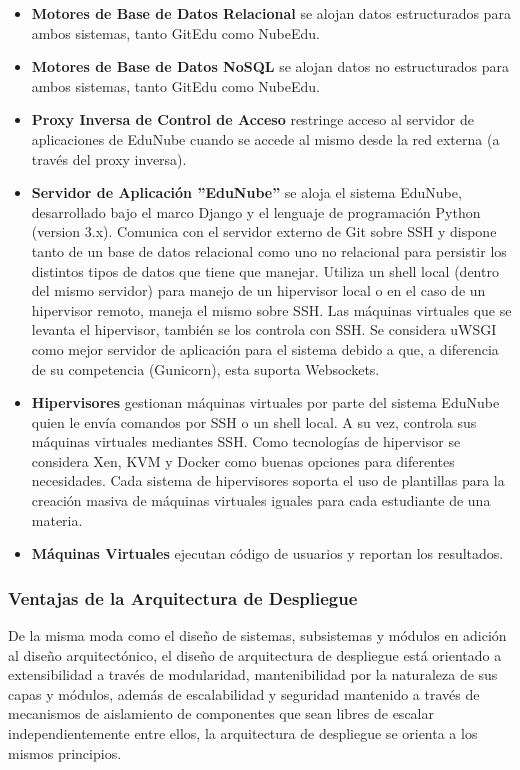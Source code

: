 \begin{itemize}
    \item \textbf{Motores de Base de Datos Relacional} se alojan datos estructurados para ambos sistemas, tanto GitEdu como NubeEdu.
    \item \textbf{Motores de Base de Datos NoSQL} se alojan datos no estructurados para ambos sistemas, tanto GitEdu como NubeEdu.
    \item \textbf{Proxy Inversa de Control de Acceso} restringe acceso al servidor de aplicaciones de EduNube cuando se accede al mismo desde la red externa (a través del proxy inversa).
    \item \textbf{Servidor de Aplicación ''EduNube''} se aloja el sistema EduNube, desarrollado bajo el marco Django y el lenguaje de programación Python (version 3.x). Comunica con el servidor externo de Git sobre SSH y dispone tanto de un base de datos relacional como uno no relacional para persistir los distintos tipos de datos que tiene que manejar. Utiliza un shell local (dentro del mismo servidor) para manejo de un hipervisor local o en el caso de un hipervisor remoto, maneja el mismo sobre SSH. Las máquinas virtuales que se levanta el hipervisor, también se los controla con SSH. Se considera uWSGI como mejor servidor de aplicación para el sistema debido a que, a diferencia de su competencia (Gunicorn), esta suporta Websockets.
    \item \textbf{Hipervisores} gestionan máquinas virtuales por parte del sistema EduNube quien le envía comandos por SSH o un shell local. A su vez, controla sus máquinas virtuales mediantes SSH. Como tecnologías de hipervisor se considera Xen, KVM y Docker como buenas opciones para diferentes necesidades. Cada sistema de hipervisores soporta el uso de plantillas para la creación masiva de máquinas virtuales iguales para cada estudiante de una materia.
    \item \textbf{Máquinas Virtuales} ejecutan código de usuarios y reportan los resultados.
\end{itemize}

\subsubsection{Ventajas de la Arquitectura de Despliegue}
De la misma moda como el diseño de sistemas, subsistemas y módulos en adición al diseño arquitectónico, el diseño de arquitectura de despliegue está orientado a extensibilidad a través de modularidad, mantenibilidad por la naturaleza de sus capas y módulos, además de escalabilidad y seguridad mantenido a través de mecanismos de aislamiento de componentes que sean libres de escalar independientemente entre ellos, la arquitectura de despliegue se orienta a los mismos principios.


